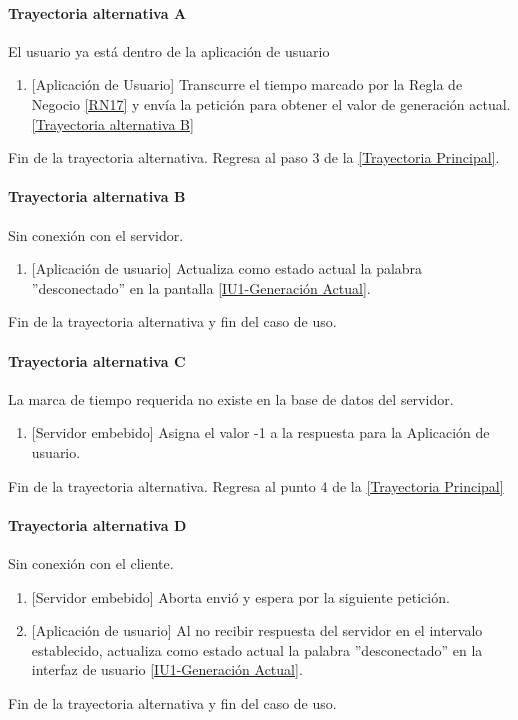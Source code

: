 \paragraph{Trayectoria alternativa A} \label{SUB-U-CU1.1:TA}
	El usuario ya está dentro de la aplicación de usuario
	\begin{enumerate}[label=A\arabic*.]
		\item {[Aplicación de Usuario]} Transcurre el tiempo marcado por la Regla de Negocio \ref{RN17} y envía la petición para obtener el valor de generación actual. \hyperref[SUB-U-CU1.1:TB]{[Trayectoria alternativa B]} 
	\end{enumerate}
	Fin de la trayectoria alternativa. Regresa al paso 3 de la \hyperref[SUB-U-CU1.1:TP]{[Trayectoria Principal]}.

\paragraph{Trayectoria alternativa B} \label{SUB-U-CU1.1:TB}
	Sin conexión con el servidor.
	\begin{enumerate}[label=B\arabic*.]
		\item {[Aplicación de usuario]} Actualiza como estado actual la palabra ''desconectado'' en la pantalla \hyperref[fig:monitoreo]{[IU1-Generación Actual]}.
	\end{enumerate}
	Fin de la trayectoria alternativa y fin del caso de uso.

\paragraph{Trayectoria alternativa C} \label{SUB-U-CU1.1:TC}
	La marca de tiempo requerida no existe en la base de datos del servidor.
	\begin{enumerate}[label=C\arabic*.]
		\item {[Servidor embebido]} Asigna el valor -1 a la respuesta para la Aplicación de usuario.
	\end{enumerate}
	Fin de la trayectoria alternativa. Regresa al punto 4 de la  \hyperref[SUB-U-CU1.1:TP]{[Trayectoria Principal]}

\paragraph{Trayectoria alternativa D} \label{SUB-U-CU1.1:TD}
	Sin conexión con el cliente.
	\begin{enumerate}[label=D\arabic*.]
		\item {[Servidor embebido]} Aborta envió y espera por la siguiente petición.
		\item {[Aplicación de usuario]} Al no recibir respuesta del servidor en el intervalo establecido, actualiza como estado actual la palabra ''desconectado'' en la interfaz de usuario \hyperref[fig:monitoreo]{[IU1-Generación Actual]}.
	\end{enumerate}
	Fin de la trayectoria alternativa y fin del caso de uso.
	
